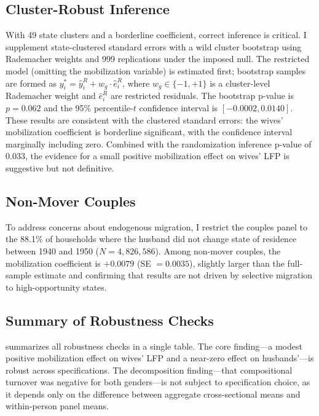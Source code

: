 \documentclass[12pt]{article}
\begin{document}
\subsection{Cluster-Robust Inference}

With 49 state clusters and a borderline coefficient, correct inference is critical. I supplement state-clustered standard errors with a wild cluster bootstrap \citep{cameron2008bootstrap} using Rademacher weights and 999 replications under the imposed null. The restricted model (omitting the mobilization variable) is estimated first; bootstrap samples are formed as $y^*_i = \hat{y}^R_i + w_g \cdot \hat{e}^R_i$, where $w_g \in \{-1, +1\}$ is a cluster-level Rademacher weight and $\hat{e}^R_i$ are restricted residuals. The bootstrap p-value is $p = 0.062$ and the 95\% percentile-$t$ confidence interval is $[-0.0002, 0.0140]$. These results are consistent with the clustered standard errors: the wives' mobilization coefficient is borderline significant, with the confidence interval marginally including zero. Combined with the randomization inference p-value of 0.033, the evidence for a small positive mobilization effect on wives' LFP is suggestive but not definitive.

\subsection{Non-Mover Couples}

To address concerns about endogenous migration, I restrict the couples panel to the 88.1\% of households where the husband did not change state of residence between 1940 and 1950 ($N = 4{,}826{,}586$). Among non-mover couples, the mobilization coefficient is $+0.0079$ (SE $= 0.0035$), slightly larger than the full-sample estimate and confirming that results are not driven by selective migration to high-opportunity states.

\subsection{Summary of Robustness Checks}

 summarizes all robustness checks in a single table. The core finding---a modest positive mobilization effect on wives' LFP and a near-zero effect on husbands'---is robust across specifications. The decomposition finding---that compositional turnover was negative for both genders---is not subject to specification choice, as it depends only on the difference between aggregate cross-sectional means and within-person panel means.
\end{document}
